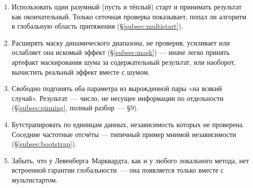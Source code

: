 \begin{enumerate}[leftmargin=1.6em,itemsep=0.25em]
  \item Использовать один разумный (пусть и тёплый) старт и принимать результат как окончательный.
        Только сеточная проверка показывает, попал ли алгоритм в глобальную область притяжения
        (§\ref{subsec:multistart}).
  \item Расширять маску динамического диапазона, не проверив, усиливает или ослабляет она искомый
        эффект (§\ref{subsec:mask}) — иначе легко принять артефакт маскирования шума за
        содержательный результат, или наоборот, вычистить реальный эффект вместе с шумом.
  \item Свободно подгонять оба параметра из вырожденной пары «на всякий случай». Результат~---
        число, не несущее информации по отдельности (§\ref{subsec:pinning}, полный разбор~--- §9).
  \item Бутстрапировать по единицам данных, независимость которых не проверена. Соседние
        частотные отсчёты — типичный пример мнимой независимости (§\ref{subsec:bootstrap}).
  \item Забыть, что у Левенберга--Марквардта, как и у любого локального метода, нет встроенной
        гарантии глобальности~--- она появляется только вместе с мультистартом.
\end{enumerate}

\clearpage
